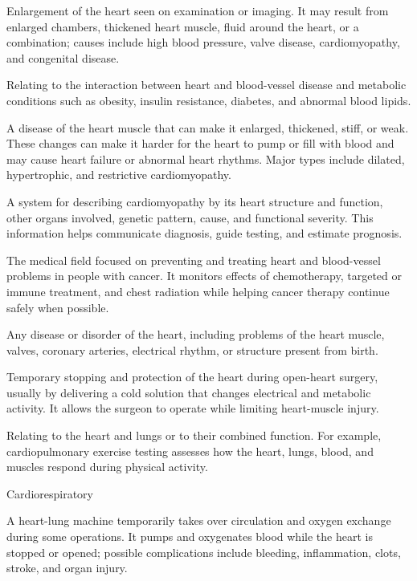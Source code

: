  Enlargement of the heart seen on examination or imaging. It may result from enlarged chambers, thickened heart muscle, fluid around the heart, or a combination; causes include high blood pressure, valve disease, cardiomyopathy, and congenital disease.

 Relating to the interaction between heart and blood-vessel disease and metabolic conditions such as obesity, insulin resistance, diabetes, and abnormal blood lipids.

 A disease of the heart muscle that can make it enlarged, thickened, stiff, or weak. These changes can make it harder for the heart to pump or fill with blood and may cause heart failure or abnormal heart rhythms. Major types include dilated, hypertrophic, and restrictive cardiomyopathy.

 A system for describing cardiomyopathy by its heart structure and function, other organs involved, genetic pattern, cause, and functional severity. This information helps communicate diagnosis, guide testing, and estimate prognosis.

 The medical field focused on preventing and treating heart and blood-vessel problems in people with cancer. It monitors effects of chemotherapy, targeted or immune treatment, and chest radiation while helping cancer therapy continue safely when possible.

 Any disease or disorder of the heart, including problems of the heart muscle, valves, coronary arteries, electrical rhythm, or structure present from birth.

 Temporary stopping and protection of the heart during open-heart surgery, usually by delivering a cold solution that changes electrical and metabolic activity. It allows the surgeon to operate while limiting heart-muscle injury.

 Relating to the heart and lungs or to their combined function. For example, cardiopulmonary exercise testing assesses how the heart, lungs, blood, and muscles respond during physical activity.

\synonyms
Cardiorespiratory

 A heart-lung machine temporarily takes over circulation and oxygen exchange during some operations. It pumps and oxygenates blood while the heart is stopped or opened; possible complications include bleeding, inflammation, clots, stroke, and organ injury.

